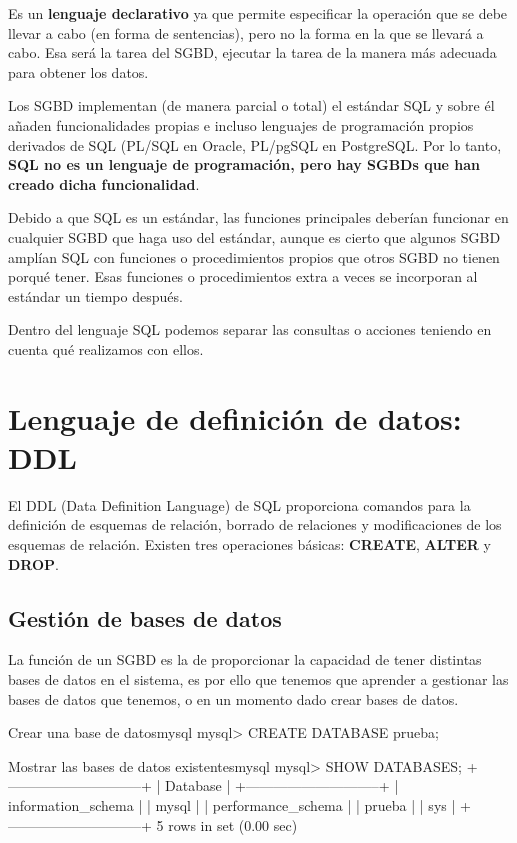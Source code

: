 Es un \textbf{lenguaje declarativo} ya que permite especificar la operación que se debe llevar a cabo (en forma de sentencias), pero no la forma en la que se llevará a cabo. Esa será la tarea del SGBD, ejecutar la tarea de la manera más adecuada para obtener los datos.

Los SGBD implementan (de manera parcial o total) el estándar SQL y sobre él añaden funcionalidades propias e incluso lenguajes de programación propios derivados de SQL (PL/SQL en Oracle, PL/pgSQL en PostgreSQL. Por lo tanto, \textbf{SQL no es un lenguaje de programación, pero hay SGBDs que han creado dicha funcionalidad}.

Debido a que SQL es un estándar, las funciones principales deberían funcionar en cualquier SGBD que haga uso del estándar, aunque es cierto que algunos SGBD amplían SQL con funciones o procedimientos propios que otros SGBD no tienen porqué tener. Esas funciones o procedimientos extra a veces se incorporan al estándar un tiempo después.

Dentro del lenguaje SQL podemos separar las consultas o acciones teniendo en cuenta qué realizamos con ellos.


\section{Lenguaje de definición de datos: DDL}
El DDL (Data Definition Language) de SQL proporciona comandos para la definición de esquemas de relación, borrado de relaciones y modificaciones de los esquemas de relación. Existen tres operaciones básicas: \textbf{CREATE}, \textbf{ALTER} y \textbf{DROP}.

\subsection{Gestión de bases de datos}
La función de un SGBD es la de proporcionar la capacidad de tener distintas bases de datos en el sistema, es por ello que tenemos que aprender a gestionar las bases de datos que tenemos, o en un momento dado crear bases de datos.


\begin{mycode}{Crear una base de datos}{mysql}{}
mysql> CREATE DATABASE prueba;
\end{mycode}




\begin{mycode}{Mostrar las bases de datos existentes}{mysql}{}
mysql> SHOW DATABASES;
+-----------------------------+
| Database                    |
+-----------------------------+
| information_schema          |
| mysql                       |
| performance_schema          |
| prueba                      |
| sys                         |
+-----------------------------+
5 rows in set (0.00 sec)
\end{mycode}


